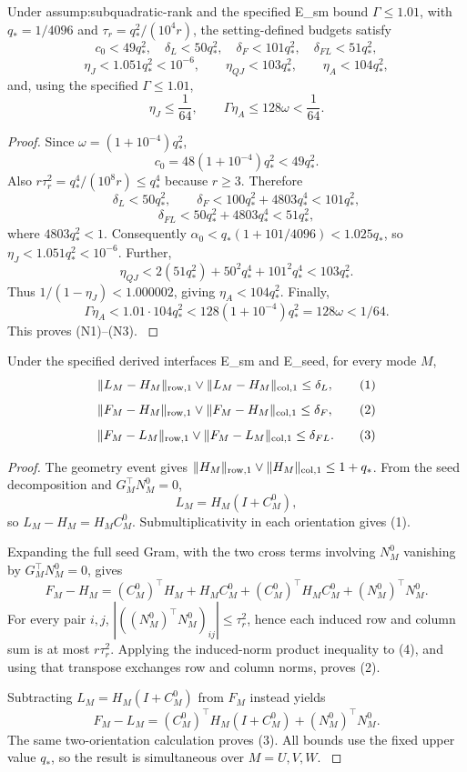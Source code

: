 \begin{proposition}\label{prop:step-009-numerical-slack}
Under assump:subquadratic-rank and the specified E\_sm bound
\(\Gamma\le1.01\), with \(q_*=1/4096\) and
\(\tau_r=q_*^2/(10^4r)\), the setting-defined budgets satisfy
\[
c_0<49q_*^2,\quad \delta_L<50q_*^2,\quad
\delta_F<101q_*^2,\quad \delta_{FL}<51q_*^2, \tag{N1}
\]
\[
\eta_J<1.051q_*^2<10^{-6},\qquad
\eta_{QJ}<103q_*^2,\qquad
\eta_A<104q_*^2, \tag{N2}
\]
and, using the specified \(\Gamma\le1.01\),
\[
\eta_J\le\frac1{64},\qquad
\Gamma\eta_A\le128\omega<\frac1{64}. \tag{N3}
\]

\begin{proof}
Since
\(\omega=(1+10^{-4})q_*^2\),
\[
c_0=48(1+10^{-4})q_*^2<49q_*^2.
\]
Also \(r\tau_r^2=q_*^4/(10^8r)\le q_*^4\) because \(r\ge3\). Therefore
\[
\delta_L<50q_*^2,\qquad
\delta_F<100q_*^2+4803q_*^4<101q_*^2,
\]
\[
\delta_{FL}<50q_*^2+4803q_*^4<51q_*^2,
\]
where \(4803q_*^2<1\). Consequently
\(\alpha_0<q_*(1+101/4096)<1.025q_*\), so
\(\eta_J<1.051q_*^2<10^{-6}\). Further,
\[
\eta_{QJ}<2(51q_*^2)+50^2q_*^4+101^2q_*^4
<103q_*^2.
\]
Thus \(1/(1-\eta_J)<1.000002\), giving
\(\eta_A<104q_*^2\). Finally,
\[
\Gamma\eta_A<1.01\cdot104q_*^2
<128(1+10^{-4})q_*^2=128\omega<1/64.
\]
This proves (N1)--(N3). \(\)


\end{proof}
\end{proposition}
\begin{lemma}\label{lem:step-009-raw-expansion}
Under the specified derived interfaces E\_sm
and E\_seed, for every mode \(M\),
\[
\|L_M-H_M\|_{\rm row,1}\vee\|L_M-H_M\|_{\rm col,1}\le\delta_L, \tag{1}
\]
\[
\|F_M-H_M\|_{\rm row,1}\vee\|F_M-H_M\|_{\rm col,1}\le\delta_F, \tag{2}
\]
\[
\|F_M-L_M\|_{\rm row,1}\vee\|F_M-L_M\|_{\rm col,1}\le\delta_{FL}. \tag{3}
\]

\begin{proof}

The geometry event gives
\(\|H_M\|_{\rm row,1}\vee\|H_M\|_{\rm col,1}\le1+q_*\). From the seed
decomposition and \(G_M^\top N_M^0=0\),
\[
L_M=H_M(I+C_M^0),
\]
so \(L_M-H_M=H_MC_M^0\). Submultiplicativity in each orientation gives
(1).

Expanding the full seed Gram, with the two cross terms involving \(N_M^0\)
vanishing by \(G_M^\top N_M^0=0\), gives
\[
F_M-H_M=(C_M^0)^\top H_M+H_MC_M^0
 +(C_M^0)^\top H_MC_M^0+(N_M^0)^\top N_M^0. \tag{4}
\]
For every pair \(i,j\),
\(\left|((N_M^0)^\top N_M^0)_{ij}\right|\le\tau_r^2\), hence each induced row and
column sum is at most \(r\tau_r^2\). Applying the induced-norm product
inequality to (4), and using that transpose exchanges row and column norms,
proves (2).

Subtracting \(L_M=H_M(I+C_M^0)\) from \(F_M\) instead yields
\[
F_M-L_M=(C_M^0)^\top H_M(I+C_M^0)+(N_M^0)^\top N_M^0. \tag{5}
\]
The same two-orientation calculation proves (3). All bounds use the fixed
upper value \(q_*\), so the result is simultaneous over \(M=U,V,W\).
\(\)


\end{proof}
\end{lemma}
